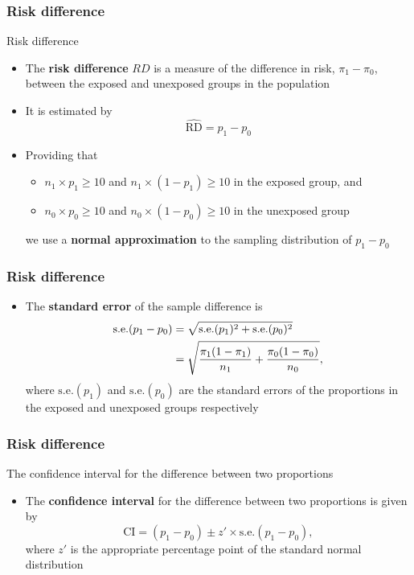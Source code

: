 \documentclass[compress, notes=hide]{beamer}
\newcommand{\hl}[1]{\textbf{#1}}
\begin{document}
\begin{frame}
	  \frametitle{Risk difference} 
\begin{block}{Risk difference}
\begin{itemize}
\item The \hl{risk difference} $RD$ is a
  measure of the difference in risk, $\pi_1 - \pi_0$, between the
  exposed and unexposed groups in the population
\item It is estimated by
\begin{equation}
\widehat{\mathrm{RD}} = p_1 - p_0\nonumber
\end{equation}
\item Providing that
\begin{itemize}
\item{$n_1 \times p_1 \geqslant 10$ and $n_1 \times (1 - p_1) \geqslant 10$ in the exposed group, and}
\item{$n_0 \times p_0 \geqslant 10$ and $n_0 \times (1 - p_0) \geqslant 10$ in the unexposed group}
\end{itemize}
we use a \hl{normal approximation} to the sampling distribution of
$p_1-p_0$
\end{itemize}
\end{block}
\end{frame}

\begin{frame}
		  \frametitle{Risk difference} 
\begin{block}{}
\begin{itemize}
\item The \hl{standard error} of the sample difference is
\begin{align}
\mathrm{s.e.}(p_1 - p_0) & = \sqrt{\mathrm{s.e.}(p_1)^2 + \mathrm{s.e.}(p_0)^2} \notag \\
& =  \sqrt{\frac{\pi_1  (1 - \pi_1)}{n_1} + \frac{\pi_0  (1 - \pi_0)}{n_0}},\nonumber
\end{align}
where $\mathrm{s.e.}(p_1)$ and $\mathrm{s.e.}(p_0)$ are the standard
errors of the proportions in the exposed and unexposed groups
respectively
\end{itemize}
\end{block}
\end{frame}

\begin{frame}
		  \frametitle{Risk difference} 
\begin{block}{The confidence interval for the difference between two proportions}
\begin{itemize}
\item The \hl{confidence interval} for the difference between two
  proportions is given by
\begin{equation}
\mathrm{CI} = (p_1 - p_0) \pm z' \times \mathrm{s.e.}(p_1 - p_0),\nonumber
\end{equation}
where $z'$ is the appropriate percentage point of the standard normal distribution
\end{itemize}
\end{block}
\end{frame}
\end{document}
